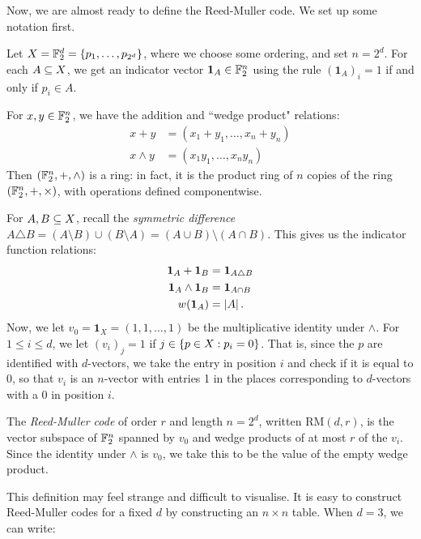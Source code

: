 \documentclass{article}
\begin{document}
Now, we are almost ready to define the Reed-Muller code. We set up some notation first.

\begin{remark}
	\label{reed-muller-code-setup}
    Let $X = \mathbb{F}_2^d = \left\lbrace p_1, \dots, p_{2^d} \right\rbrace$, where we choose some ordering, and set $n = 2^d$. For each $A \subseteq X$, we get an indicator vector $\mathbf{1}_A \in \mathbb{F}_2^n$ using the rule $(\mathbf{1}_A)_i = 1$ if and only if $p_i \in A$.
    
    For $x, y \in \mathbb{F}_2^n$, we have the addition and ``wedge product" relations:
    \begin{align*}
	    x + y &= (x_1 + y_1, \dots, x_n + y_n) \\
	    x \land y &= (x_1 y_1, \dots, x_n y_n)
	\end{align*}
	Then $(\mathbb{F}_2^n, +, \land)$ is a ring: in fact, it is the product ring of $n$ copies of the ring $(\mathbb{F}_2^n, +, \times)$, with operations defined componentwise.
	
	For $A, B \subseteq X$, recall the \textit{symmetric difference} $A \triangle B = (A \setminus B) \cup (B \setminus A) = (A \cup B) \setminus (A \cap B)$. This gives us the indicator function relations:
	\begin{align*}
	    \mathbf{1}_A + \mathbf{1}_B &= \mathbf{1}_{A \triangle B} \\
	    \mathbf{1}_A \land \mathbf{1}_B &= \mathbf{1}_{A \cap B} \\
	    w(\mathbf{1}_A) &= \left\lvert A \right\rvert.
	\end{align*}
	Now, we let $v_0 = \mathbf{1}_X = (1, 1, \dots, 1)$ be the multiplicative identity under $\land$. For $1 \leq i \leq d$, we let $(v_i)_j = 1$ if $j \in \left\lbrace p \in X: p_i = 0 \right\rbrace$. That is, since the $p$ are identified with $d$-vectors, we take the entry in position $i$ and check if it is equal to $0$, so that $v_i$ is an $n$-vector with entries 1 in the places corresponding to $d$-vectors with a 0 in position $i$.
\end{remark}

\begin{definition}
    The \textit{Reed-Muller code} of order $r$ and length $n = 2^d$, written $\mathrm{RM}(d, r)$, is the vector subspace of $\mathbb{F}_2^n$ spanned by $v_0$ and wedge products of at most $r$ of the $v_i$. Since the identity under $\land$ is $v_0$, we take this to be the value of the empty wedge product.
\end{definition}

This definition may feel strange and difficult to visualise. It is easy to construct Reed-Muller codes for a fixed $d$ by constructing an $n \times n$ table. When $d = 3$, we can write:
\end{document}
